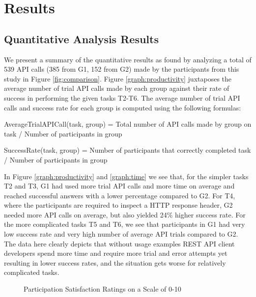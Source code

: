 \documentclass[conference]{IEEEtran}
\begin{document}
\section{Results}
\label{sec:results}


\subsection{Quantitative Analysis Results} %


We present a summary of the quantitative results as found by analyzing a total of 539 API calls (385 from G1, 152 from G2) made by the participants from this study in Figure \ref{fig:comparison}. Figure \ref{graph:productivity} juxtaposes the average number of trial API calls made by each group against their rate of success in performing the given tasks T2-T6. The average number of trial API calls and success rate for each group is computed using the following formulas:

AverageTrialAPICall(task, group) = Total number of API calls made by group on task / Number of participants in group

SuccessRate(task, group) = Number of participants that correctly completed task / Number of participants in group

In Figure \ref{graph:productivity} and  \ref{graph:time} we see that, for the simpler tasks T2 and T3, G1 had used more trial API calls and more time on average and reached successful answers with a lower percentage compared to G2. For T4, where the participants are required to inspect a HTTP response header, G2 needed more API calls on average, but also yielded 24\% higher success rate. For the more complicated tasks T5 and T6, we see that participants in G1 had very low success rate and very high number of average API trials compared to G2. The data here clearly depicts that without usage examples REST API client developers spend more time and require more trial and error attempts yet resulting in lower success rates, and the situation gets worse for relatively complicated tasks.

\begin{figure}[h]
\centering

\caption{Participation Satisfaction Ratings on a Scale of 0-10}
\label{fig:rating}

\end{figure}
\end{document}

